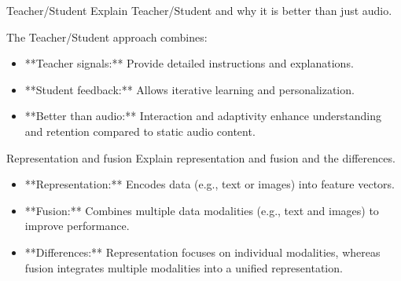 \documentclass{article}
\begin{document}
\begin{exercise}{Teacher/Student}
  Explain Teacher/Student and why it is better than just audio.

  \begin{solution}
    The Teacher/Student approach combines:
    \begin{itemize}
        \item **Teacher signals:** Provide detailed instructions and explanations.
        \item **Student feedback:** Allows iterative learning and personalization.
        \item **Better than audio:** Interaction and adaptivity enhance understanding and retention compared to static audio content.
    \end{itemize}
  \end{solution}
\end{exercise}

\begin{exercise}{Representation and fusion}
  Explain representation and fusion and the differences.

  \begin{solution}
    \begin{itemize}
        \item **Representation:** Encodes data (e.g., text or images) into feature vectors.
        \item **Fusion:** Combines multiple data modalities (e.g., text and images) to improve performance.
        \item **Differences:** Representation focuses on individual modalities, whereas fusion integrates multiple modalities into a unified representation.
    \end{itemize}
  \end{solution}
\end{exercise}
\end{document}
